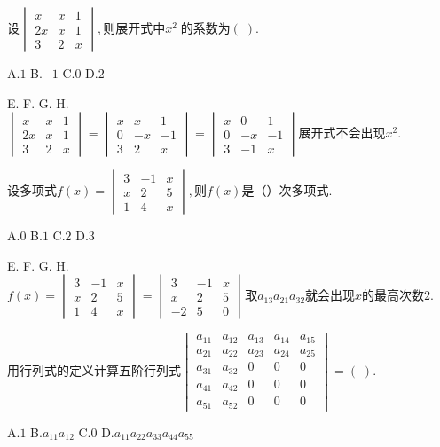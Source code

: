 $设\begin{vmatrix}x&x&1\\2x&x&1\\3&2&x\end{vmatrix},\mathrm{则展开式中}x^2\;\mathrm{的系数为}(\;).$

A.$1$   B.$-1$   C.$0$   D.$2$

E.   F.   G.   H.
$\begin{vmatrix}x&x&1\\2x&x&1\\3&2&x\end{vmatrix}=\begin{vmatrix}x&x&1\\0&-x&-1\\3&2&x\end{vmatrix}=\begin{vmatrix}x&0&1\\0&-x&-1\\3&-1&x\end{vmatrix}\mathrm{展开式不会出现}x^2.$


$\mathrm{设多项式}f(x)=\begin{vmatrix}3&-1&x\\x&2&5\\1&4&x\end{vmatrix},则f(x)是（）\mathrm{次多项式}.$

A.$0$   B.$1$   C.$2$   D.$3$

E.   F.   G.   H.
$f(x)=\begin{vmatrix}3&-1&x\\x&2&5\\1&4&x\end{vmatrix}=\begin{vmatrix}3&-1&x\\x&2&5\\-2&5&0\end{vmatrix}取a_{13}a_{21}a_{32}\mathrm{就会出现}x\mathrm{的最高次数}2.$


$\mathrm{用行列式的定义计算五阶行列式}\begin{vmatrix}a_{11}&a_{12}&a_{13}&a_{14}&a_{15}\\a_{21}&a_{22}&a_{23}&a_{24}&a_{25}\\a_{31}&a_{32}&0&0&0\\a_{41}&a_{42}&0&0&0\\a_{51}&a_{52}&0&0&0\end{vmatrix}=(\;).$

A.$1$   B.$a_{11}a_{12}$   C.$0$   D.$a_{11}a_{22}a_{33}a_{44}a_{55}$

